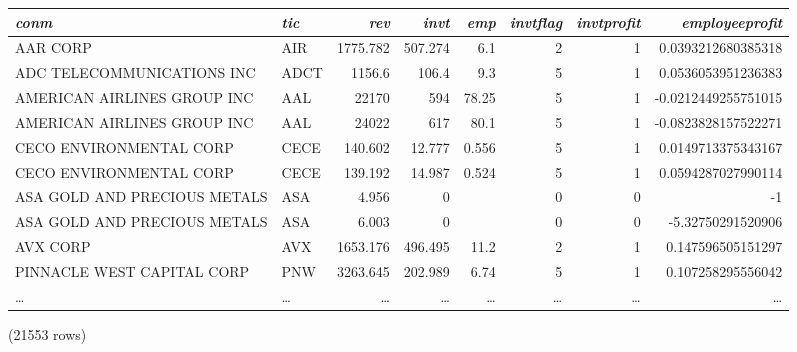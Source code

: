 \documentclass[]{article}
\newenvironment{question}[2][Question]{\begin{trivlist}
\item[\hskip \labelsep {\bfseries #1}\hskip \labelsep {\bfseries #2.}]}{\end{trivlist}}
\begin{document}
\begin{question}{3}
\begin{enumerate}[label=(\alph*)]
\begin{center}
\begin{adjustbox}{width=1.2\linewidth,totalheight=4in, center}
\begin{tabular}{l | l | r | r | r | r | r | r}
\textit{conm} & \textit{tic} & \textit{rev} & \textit{invt} & \textit{emp} & \textit{invtflag} & \textit{invtprofit} & \textit{employeeprofit} \\
\hline
AAR CORP & AIR & 1775.782 & 507.274 & 6.1 & 2 & 1 & 0.0393212680385318 \\
ADC TELECOMMUNICATIONS INC & ADCT & 1156.6 & 106.4 & 9.3 & 5 & 1 & 0.0536053951236383 \\
AMERICAN AIRLINES GROUP INC & AAL & 22170 & 594 & 78.25 & 5 & 1 & -0.0212449255751015 \\
AMERICAN AIRLINES GROUP INC & AAL & 24022 & 617 & 80.1 & 5 & 1 & -0.0823828157522271 \\
CECO ENVIRONMENTAL CORP & CECE & 140.602 & 12.777 & 0.556 & 5 & 1 & 0.0149713375343167 \\
CECO ENVIRONMENTAL CORP & CECE & 139.192 & 14.987 & 0.524 & 5 & 1 & 0.0594287027990114 \\
ASA GOLD AND PRECIOUS METALS & ASA & 4.956 & 0 &  & 0 & 0 & -1 \\
ASA GOLD AND PRECIOUS METALS & ASA & 6.003 & 0 &  & 0 & 0 & -5.32750291520906 \\
AVX CORP & AVX & 1653.176 & 496.495 & 11.2 & 2 & 1 & 0.147596505151297 \\
PINNACLE WEST CAPITAL CORP & PNW & 3263.645 & 202.989 & 6.74 & 5 & 1 & 0.107258295556042 \\
\ldots & \ldots & \ldots & \ldots & \ldots & \ldots & \ldots & \ldots \\
\end{tabular}
\end{adjustbox}

\noindent (21553 rows) \\
\end{center}


\end{enumerate}
\end{question}
 
 
\end{document}
